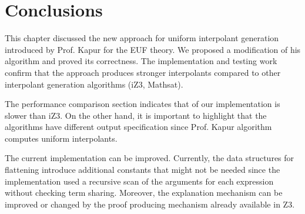 \section{Conclusions}

This chapter discussed the new approach
for uniform interpolant generation introduced by
Prof. Kapur for the EUF theory. We 
proposed a modification of his algorithm
and proved its correctness. The 
implementation and testing work confirm
that the approach produces stronger interpolants
compared to other interpolant generation
algorithms (iZ3, Mathsat).

The performance comparison section indicates
that of our implementation is slower 
than iZ3. 
On the other hand, it is important to 
highlight that the algorithms have different
output specification since Prof. Kapur algorithm
computes uniform interpolants.

The current implementation can be improved. 
Currently, the data structures
for flattening introduce additional constants
that might not be needed since the implementation
used a recursive scan of the arguments for each
expression without checking term sharing.
Moreover, the explanation mechanism can be
improved or changed by the proof producing mechanism
already available in Z3. 

